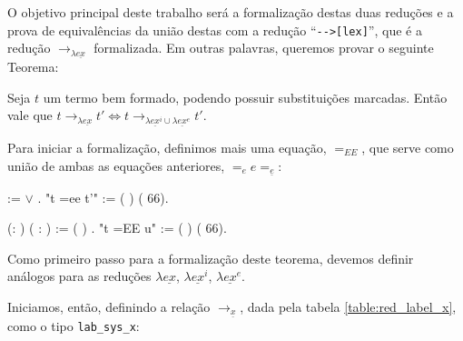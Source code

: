 O objetivo principal deste trabalho será a formalização destas duas reduções e a
prova de equivalências da união destas com a redução ``\texttt{-{}->[lex]}'', que é a
redução $\rightarrow_{\lambda \underline{ex}}$ formalizada. Em outras palavras, queremos
provar o seguinte Teorema:

\begin{teorema}\label{teo:main}
    Seja $t$ um termo bem formado, podendo possuir substituições marcadas. Então
    vale que $t \rightarrow_{\lambda \underline{ex}} t' \iff t
    \rightarrow_{\lambda \underline{ex}^i \cup \lambda \underline{ex}^e} t'$. 
\end{teorema}

Para iniciar a formalização, definimos mais uma equação, $=_{EE}$, que serve
como união de ambas as equações anteriores, $=_e e =_{\underline{e}}$:

\bigskip

\coqdocnoindent {}  
 :=    \ensuremath{\lor}
  .\coqdoceol \coqdocnoindent
{} "t =ee t'" := ( 
) (  66).\coqdoceol \coqdocemptyline


\coqdocnoindent {} 
(: ) ( : ) :=
 (
)   .\coqdoceol \coqdocnoindent
{} "t =EE u" := ( 
) (  66).\coqdoceol \coqdocemptyline


Como primeiro passo para a formalização deste teorema, devemos definir análogos
para as reduções $\lambda \underline{ex}$, $\lambda \underline{ex}^i$, $\lambda
\underline{ex}^e$.

Iniciamos, então, definindo a relação $\rightarrow_{\underline{x}}$, dada pela
tabela \ref{table:red_label_x}, como o tipo \texttt{lab\_sys\_x}:

\bigskip

